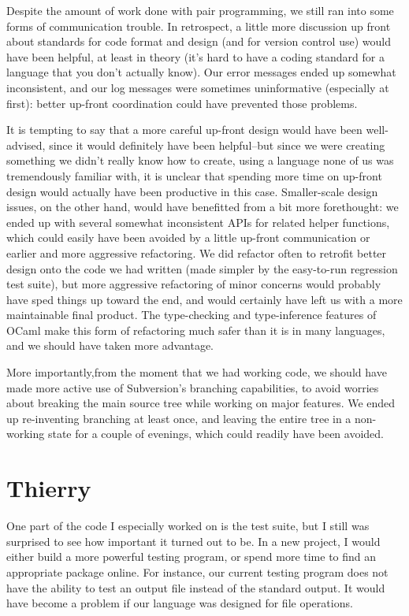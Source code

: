 Despite the amount of work done with pair programming, we still ran into some 
forms of communication trouble.  In retrospect, a little more discussion up front
about standards for code format and design (and for version control use) would 
have been helpful, at least in theory (it's hard to have a 
coding standard for a language that you don't actually know).  
Our error messages ended up 
somewhat inconsistent, and our log messages were sometimes uninformative (especially at first):
better up-front coordination could have prevented those problems.  

It is tempting to say that a more careful up-front design would have been well-advised, since it would 
definitely have been helpful--but since we were creating something we didn't really know how to create,
using a language none of us was tremendously familiar with, it is unclear that spending more time on
up-front design would actually have been productive in this case.  
Smaller-scale design issues, on the other hand, would have benefitted from a bit more forethought:
we ended up with several somewhat inconsistent APIs for related helper functions, which could easily have been avoided by a little up-front communication or earlier and more aggressive refactoring.
We did refactor often to retrofit better design onto the code we had written (made simpler by the easy-to-run regression test suite), but more aggressive refactoring of minor concerns would probably have sped things up toward the end, and would certainly have left us  with a more maintainable final product.  The type-checking and type-inference features of OCaml make this form of refactoring much safer than it is in many languages, and we should have taken more advantage.

More importantly,from the moment that we had working code, we should have made more active use
of Subversion's branching capabilities, to avoid worries about breaking the main source tree while working on major features.  We ended up re-inventing branching at least once, and leaving the entire 
tree in a non-working state for a couple of evenings, which could readily have been avoided.


\section{Thierry}
One part of the code I especially worked on is the test suite, but I still
was surprised to see how important it turned out to be. In a new project,
I would either build a more powerful testing program, or spend more
time to find an appropriate package online. For instance, our current
testing program does not have the ability to test an output file instead
of the standard output. It would have become a problem if our language was
designed for file operations.

